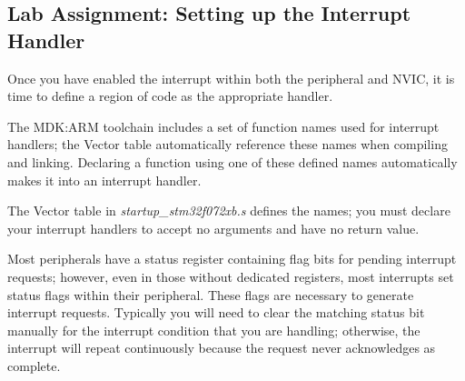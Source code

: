 \documentclass[openany,11pt,fleqn]{book} %
\makeatletter
\newcommand{\ilcode}[1]{
    \smallskip
    \colorbox{gray!20!white}{
        \centering
        \parbox{\linewidth-2\fboxsep}{
            \lstinline@#1@
        }
    }
}
\makeatother
\begin{document}
%    
%    
%    
%    
%    



\subsection{\color{blue}Lab Assignment: Setting up the Interrupt Handler}  \label{handler_setup}
Once you have enabled the interrupt within both the peripheral and NVIC, it is time to define a region of code as the appropriate handler. 

The MDK:ARM toolchain includes a set of function names used for interrupt handlers; the Vector table automatically reference these names when compiling and linking. Declaring a function using one of these defined names automatically makes it into an interrupt handler.

The Vector table in \textit{startup\_stm32f072xb.s} defines the names; you must declare your interrupt handlers to accept no arguments and have no return value. 

Most peripherals have a status register containing flag bits for pending interrupt requests; however, even in those without dedicated registers, most interrupts set status flags within their peripheral. These flags are necessary to generate interrupt requests. Typically you will need to clear the matching status bit manually for the interrupt condition that you are handling; otherwise, the interrupt will repeat continuously because the request never acknowledges as complete. 
\end{document}

